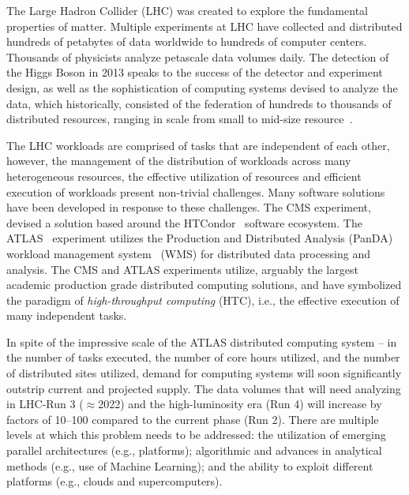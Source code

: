 
The Large Hadron Collider (LHC) was created to explore the fundamental
properties of matter. Multiple experiments at LHC have collected and
distributed hundreds of petabytes of data worldwide to hundreds of computer
centers. Thousands of physicists analyze petascale data volumes daily. The
detection of the Higgs Boson in 2013 speaks to the success of the detector
and experiment design, as well as the sophistication of computing systems
devised to analyze the data, which historically, consisted of the federation
of hundreds to thousands of distributed resources, ranging in scale from
small to mid-size resource~\cite{foster2003grid}.

The LHC workloads are comprised of tasks that are independent of each other,
however, the management of the distribution of workloads across many
heterogeneous resources, the effective utilization of resources and efficient
execution of workloads present non-trivial challenges. Many software
solutions have been developed in response to these challenges. The CMS
experiment, devised a solution based around the
HTCondor~\cite{thain2005distributed} software ecosystem. The
ATLAS~\cite{Aad:2008} experiment utilizes the Production and Distributed
Analysis (PanDA) workload management system~\cite{Maeno2011} (WMS) for
distributed data processing and analysis. The CMS and ATLAS experiments
utilize, arguably the largest academic production grade distributed computing
solutions, and have symbolized the paradigm of {\it high-throughput
computing} (HTC), i.e., the effective execution of many independent tasks.

In spite of the impressive scale of the ATLAS distributed computing system --
in the number of tasks executed, the number of core hours utilized, and the
number of distributed sites utilized,  demand for computing systems will soon
significantly outstrip current and projected supply.   The data volumes that
will need analyzing in LHC-Run 3 ($\approx$2022) and the high-luminosity
era (Run 4) will increase by factors of 10--100 compared to the current phase
(Run 2). There are multiple levels at which this problem needs to be
addressed: the utilization of emerging parallel architectures (e.g.,
platforms); algorithmic and advances in analytical methods (e.g., use of
Machine Learning); and the ability to exploit different platforms (e.g.,
clouds and supercomputers).

